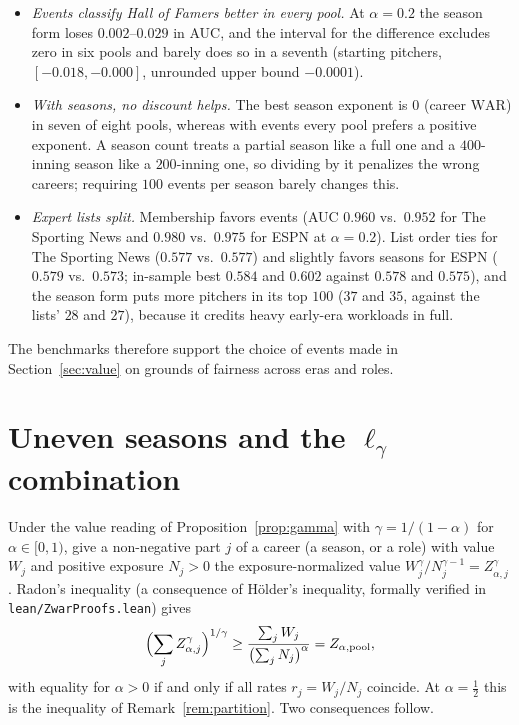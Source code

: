 \documentclass[11pt,letterpaper]{article}
\theoremstyle{plain}
\theoremstyle{definition}
\theoremstyle{remark}
\newcommand{\WAR}{\mathrm{WAR}}
\begin{document}
\begin{itemize}
    \item \emph{Events classify Hall of Famers better in every pool.} At $\alpha = 0.2$ the season form loses $0.002$--$0.029$ in AUC, and the interval for the difference excludes zero in six pools and barely does so in a seventh (starting pitchers, $[-0.018, -0.000]$, unrounded upper bound $-0.0001$).
    \item \emph{With seasons, no discount helps.} The best season exponent is $0$ (career $\WAR$) in seven of eight pools, whereas with events every pool prefers a positive exponent. A season count treats a partial season like a full one and a $400$-inning season like a $200$-inning one, so dividing by it penalizes the wrong careers; requiring $100$ events per season barely changes this.
    \item \emph{Expert lists split.} Membership favors events (AUC $0.960$ vs.\ $0.952$ for The Sporting News and $0.980$ vs.\ $0.975$ for ESPN at $\alpha = 0.2$). List order ties for The Sporting News ($0.577$ vs.\ $0.577$) and slightly favors seasons for ESPN ($0.579$ vs.\ $0.573$; in-sample best $0.584$ and $0.602$ against $0.578$ and $0.575$), and the season form puts more pitchers in its top $100$ ($37$ and $35$, against the lists' $28$ and $27$), because it credits heavy early-era workloads in full.
\end{itemize}
The benchmarks therefore support the choice of events made in Section~\ref{sec:value} on grounds of fairness across eras and roles.

\section{Uneven seasons and the \texorpdfstring{$\ell_\gamma$}{l-gamma} combination}
\label{app:radon}

Under the value reading of Proposition~\ref{prop:gamma} with $\gamma = 1/(1-\alpha)$ for $\alpha \in [0,1)$, give a non-negative part $j$ of a career (a season, or a role) with value $W_j$ and positive exposure $N_j > 0$ the exposure-normalized value $W_j^{\gamma}/N_j^{\gamma-1} = Z_{\alpha,j}^{\gamma}$. Radon's inequality (a consequence of H\"older's inequality, formally verified in \texttt{lean/ZwarProofs.lean}) gives
\begin{equation}
    \Bigl(\sum_j Z_{\alpha,j}^{\gamma}\Bigr)^{1/\gamma} \ge \frac{\sum_j W_j}{\bigl(\sum_j N_j\bigr)^{\alpha}} = Z_{\alpha,\mathrm{pool}},
\end{equation}
with equality for $\alpha > 0$ if and only if all rates $r_j = W_j/N_j$ coincide. At $\alpha = \tfrac12$ this is the inequality of Remark~\ref{rem:partition}. Two consequences follow.
\end{document}
